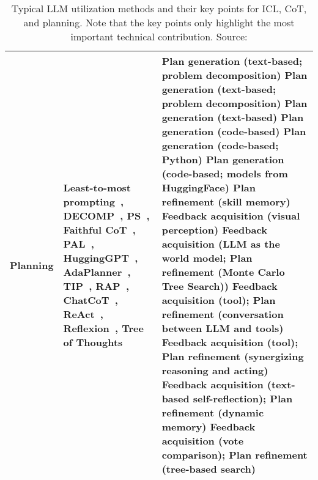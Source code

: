 \begin{table}[h!]
\begin{tabularx}{\textwidth}{|l|X|X|}
		\textbf{Planning}                         & Least-to-most prompting~\cite{zhou2022least}, DECOMP~\cite{khot2022decomposed}, PS~\cite{wang2023plan}, Faithful CoT~\cite{lyu2023faithful}, PAL~\cite{gao2022pal}, HuggingGPT~\cite{shen2023hugginggpt}, AdaPlanner~\cite{sun2023adaplanner}, TIP~\cite{lu2023multimodal}, RAP~\cite{hao2023reasoning}, ChatCoT~\cite{chen2023chatcot}, ReAct~\cite{yao2022react}, Reflexion~\cite{shinn2023reflexion}, Tree of Thoughts~\cite{yao2023tree} & Plan generation (text-based; problem decomposition) \newline Plan generation (text-based; problem decomposition) \newline Plan generation (text-based) \newline Plan generation (code-based) \newline Plan generation (code-based; Python) \newline Plan generation (code-based; models from HuggingFace) \newline Plan refinement (skill memory) \newline Feedback acquisition (visual perception) \newline Feedback acquisition (LLM as the world model; Plan refinement (Monte Carlo Tree Search)) \newline Feedback acquisition (tool); Plan refinement (conversation between LLM and tools) \newline Feedback acquisition (tool); Plan refinement (synergizing reasoning and acting) \newline Feedback acquisition (text-based self-reflection); Plan refinement (dynamic memory) \newline Feedback acquisition (vote comparison); Plan refinement (tree-based search) \\
		\hline
	\end{tabularx}
	\caption{Typical LLM utilization methods and their key points for ICL, CoT, and planning. Note that the key points only highlight the most important technical contribution. Source: \textcite{survey}}
	\label{tab:utilization-methods}
\end{table}

